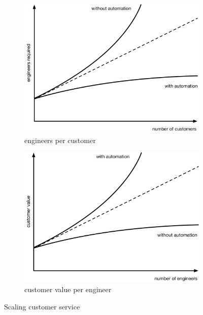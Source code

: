 \documentclass[reprint,amsmath,amssymb,aps]{revtex4-1}
\begin{document}
\begin{figure}[h]
        \begin{subfigure}{0.45\textwidth}
                \includegraphics[width=1\textwidth]{figs/scaling}
                \caption{engineers per customer}
                \label{fig:engineers-needed}
        \end{subfigure}
        \begin{subfigure}{0.45\textwidth}
                \includegraphics[width=1\textwidth]{figs/customervalue}
                \caption{customer value per engineer}
                \label{fig:value-engineer}
        \end{subfigure}
        \caption{Scaling customer service}
        \label{fig:scaling}
\end{figure}
\end{document}
